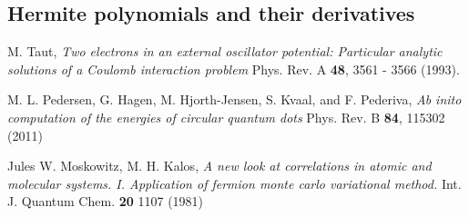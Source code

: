 \documentclass[english, a4paper]{article}
\begin{document}
\subsection{Hermite polynomials and their derivatives}
















\begin{thebibliography}{9}


 M. Taut, 
 \textit{Two electrons in an external oscillator potential: Particular analytic solutions
 of a Coulomb interaction problem}
 Phys. Rev. A {\bf 48}, 3561 - 3566 (1993).
 
 M. L. Pedersen, G. Hagen, M. Hjorth-Jensen, S. Kvaal, and F. Pederiva, 
 \textit{Ab inito computation of the energies of circular quantum dots}
 Phys. Rev. B {\bf 84}, 115302 (2011)
 
 Jules W. Moskowitz, M. H. Kalos,
 \textit{A new look at correlations in atomic and molecular systems. 
         I. Application of fermion monte carlo variational method.}
 Int. J. Quantum Chem. {\bf 20} 1107 (1981)

\end{thebibliography}
\end{document}
